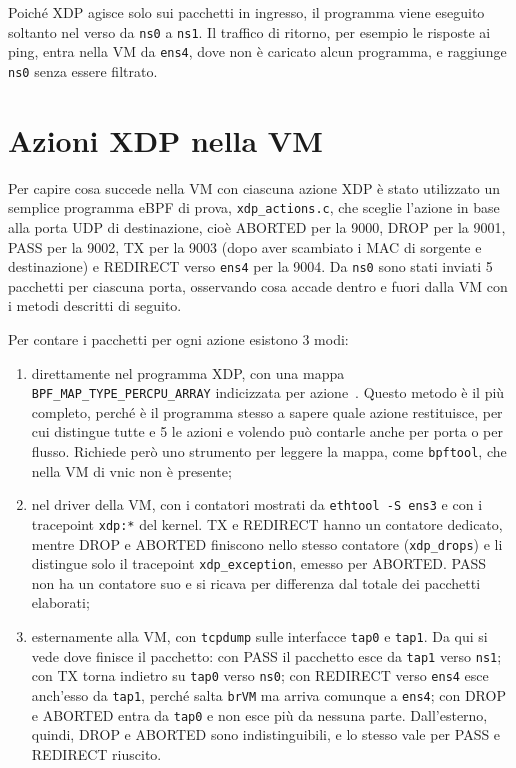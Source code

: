 Poiché XDP agisce solo sui pacchetti in ingresso, il programma viene eseguito soltanto nel verso da \texttt{ns0} a \texttt{ns1}. Il traffico di ritorno, per esempio le risposte ai ping, entra nella VM da \texttt{ens4}, dove non è caricato alcun programma, e raggiunge \texttt{ns0} senza essere filtrato.

\section{Azioni XDP nella VM}\label{sec:azioni-xdp}

Per capire cosa succede nella VM con ciascuna azione XDP è stato utilizzato un semplice programma eBPF di prova, \texttt{xdp\_actions.c}, che sceglie l'azione in base alla porta UDP di destinazione, cioè ABORTED per la 9000, DROP per la 9001, PASS per la 9002, TX per la 9003 (dopo aver scambiato i MAC di sorgente e destinazione) e REDIRECT verso \texttt{ens4} per la 9004. Da \texttt{ns0} sono stati inviati 5 pacchetti per ciascuna porta, osservando cosa accade dentro e fuori dalla VM con i metodi descritti di seguito.

Per contare i pacchetti per ogni azione esistono 3 modi:
\begin{enumerate}
    \item direttamente nel programma XDP, con una mappa \texttt{BPF\_MAP\_TYPE\_PERCPU\_ARRAY} indicizzata per azione~\cite{xdp-tutorial}. Questo metodo è il più completo, perché è il programma stesso a sapere quale azione restituisce, per cui distingue tutte e 5 le azioni e volendo può contarle anche per porta o per flusso. Richiede però uno strumento per leggere la mappa, come \texttt{bpftool}, che nella VM di vnic non è presente;
    \item nel driver della VM, con i contatori mostrati da \texttt{ethtool -S ens3} e con i tracepoint \texttt{xdp:*} del kernel. TX e REDIRECT hanno un contatore dedicato, mentre DROP e ABORTED finiscono nello stesso contatore (\texttt{xdp\_drops}) e li distingue solo il tracepoint \texttt{xdp\_exception}, emesso per ABORTED. PASS non ha un contatore suo e si ricava per differenza dal totale dei pacchetti elaborati;
    \item esternamente alla VM, con \texttt{tcpdump} sulle interfacce \texttt{tap0} e \texttt{tap1}. Da qui si vede dove finisce il pacchetto: con PASS il pacchetto esce da \texttt{tap1} verso \texttt{ns1}; con TX torna indietro su \texttt{tap0} verso \texttt{ns0}; con REDIRECT verso \texttt{ens4} esce anch'esso da \texttt{tap1}, perché salta \texttt{brVM} ma arriva comunque a \texttt{ens4}; con DROP e ABORTED entra da \texttt{tap0} e non esce più da nessuna parte. Dall'esterno, quindi, DROP e ABORTED sono indistinguibili, e lo stesso vale per PASS e REDIRECT riuscito.
\end{enumerate}

